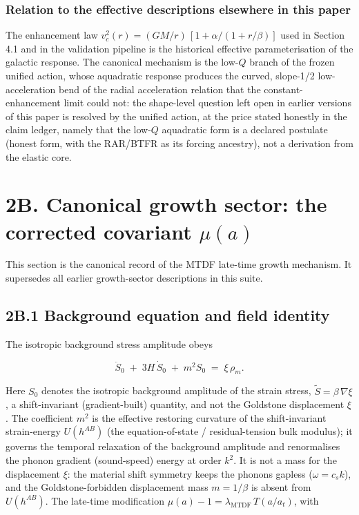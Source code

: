 \documentclass[11pt,a4paper]{article}
\begin{document}
\begin{mdframed}[linecolor=accent,linewidth=0.5pt,backgroundcolor=callout-bg,leftline=true,rightline=true,topline=true,bottomline=true,innerleftmargin=8pt,innerrightmargin=8pt,innertopmargin=6pt,innerbottommargin=6pt]
\subsubsection*{Relation to the effective descriptions elsewhere in this paper}
The enhancement law \(v_c^2(r) = (GM/r)\,[1 + \alpha/(1 + r/\beta)]\) used in Section 4.1 and in the validation pipeline is the historical effective parameterisation of the galactic response. The canonical mechanism is the low-\(Q\) branch of the frozen unified action, whose aquadratic response produces the curved, slope-1/\allowbreak{}2 low-acceleration bend of the radial acceleration relation that the constant-enhancement limit could not: the shape-level question left open in earlier versions of this paper is resolved by the unified action, at the price stated honestly in the claim ledger, namely that the low-\(Q\) aquadratic form is a declared postulate (honest form, with the RAR/\allowbreak{}BTFR as its forcing ancestry), not a derivation from the elastic core.
\end{mdframed}

\section*{2B. Canonical growth sector: the corrected covariant \(\mu(a)\)}
\label{sec:sec2b}
This section is the canonical record of the MTDF late-time growth mechanism. It supersedes all earlier growth-sector descriptions in this suite.

\subsection*{2B.1 Background equation and field identity}
The isotropic background stress amplitude obeys

\[
\ddot{S}_0 \;+\; 3H\,\dot{S}_0 \;+\; m^2 S_0 \;=\; \xi\,\rho_m .
\]

Here \(S_0\) denotes the isotropic background amplitude of the strain stress, \(\tilde{S} = \beta\,\nabla\xi\), a shift-invariant (gradient-built) quantity, and not the Goldstone displacement \(\xi\). The coefficient \(m^2\) is the effective restoring curvature of the shift-invariant strain-energy \(U(h^{AB})\) (the equation-of-state / residual-tension bulk modulus); it governs the temporal relaxation of the background amplitude and renormalises the phonon gradient (sound-speed) energy at order \(k^2\). It is not a mass for the displacement \(\xi\): the material shift symmetry keeps the phonons gapless (\(\omega = c_s k\)), and the Goldstone-forbidden displacement mass \(m = 1/\beta\) is absent from \(U(h^{AB})\). The late-time modification \(\mu(a) - 1 = \lambda_{\mathrm{MTDF}}\, T(a/a_t)\), with
\end{document}
